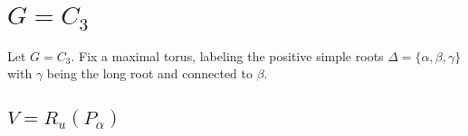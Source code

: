 
			\section{$G = C_3$}
			\label{c3}
			Let $G=C_3$. Fix a maximal torus, labeling the positive simple roots $\Delta=\{\alpha, \beta, \gamma\}$ with $\gamma$ being the long root and connected to $\beta$. 

			\subsection{$V = R_u(P_\alpha)$}
			\label{c3:alpha}

